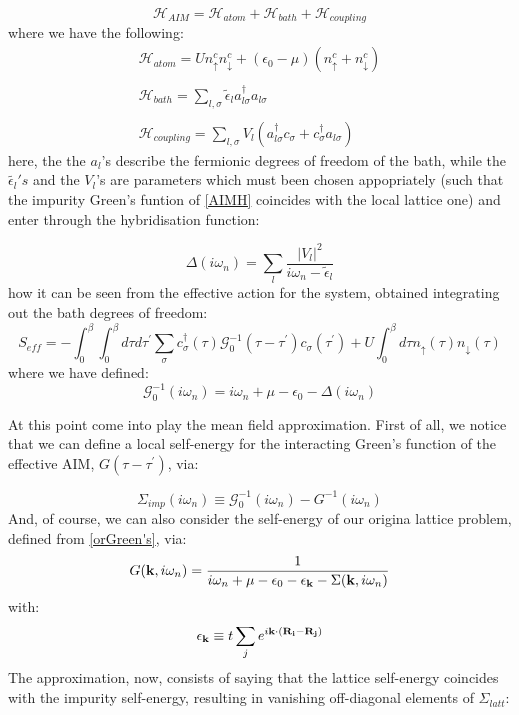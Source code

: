 \begin{equation}
\mathcal{H}_{AIM} = \mathcal{H}_{atom} + \mathcal{H}_{bath} + \mathcal{H}_{coupling}
\end{equation}
where we have the following:
\begin{equation}\label{AIMH}
\begin{array}{c}
\mathcal{H}_{atom} = Un_\uparrow^cn_\downarrow^c + (\epsilon_0 - \mu)(n_\uparrow^c+n_\downarrow^c) \\ \\ \mathcal{H}_{bath} = \sum_{l,\sigma}\tilde{\epsilon}_la_{l\sigma}^\dagger a_{l\sigma} \\ \\ \mathcal{H}_{coupling} = \sum_{l,\sigma}V_l(a_{l\sigma}^\dagger c_{\sigma} + c_{\sigma}^\dagger a_{l\sigma})
\end{array}
\end{equation}
here, the the $a_l$'s describe the fermionic degrees of freedom of the bath, while the $\tilde{\epsilon_l}'s$ and the $V_l$'s are parameters which must been chosen appopriately (such that the impurity Green's funtion of \eqref{AIMH} coincides with the local lattice one) and enter through the hybridisation function:

\begin{equation}
\Delta(i\omega_n) = \sum_l\frac{|V_l|^2}{i\omega_n - \tilde{\epsilon}_l}
\end{equation}
how it can be seen from the effective action for the system, obtained integrating out the bath degrees of freedom:
\begin{equation}
S_{eff} = -\int_0^\beta\int_0^\beta d\tau d\tau^\prime\sum_\sigma c_\sigma^\dagger(\tau)\mathscr{G}_0^{-1}(\tau-\tau^\prime)c_\sigma(\tau^\prime) + U\int_0^\beta d\tau n_\uparrow(\tau)n_\downarrow(\tau)
\end{equation}
where we have defined:
\begin{equation}
\mathscr{G}_0^{-1}(i\omega_n) = i\omega_n + \mu - \epsilon_0 - \Delta(i\omega_n) 
\end{equation}

At this point come into play the mean field approximation. First of all, we notice that we can define a local self-energy for the interacting Green's function of the effective AIM, $G(\tau-\tau^\prime)$, via:

\begin{equation}\label{s_imp}
\Sigma_{imp}(i\omega_n) \equiv \mathscr{G}_0^{-1}(i\omega_n) - G^{-1}(i\omega_n)
\end{equation}
And, of course, we can also consider the self-energy of our origina lattice problem, defined from \eqref{orGreen's}, via:
\begin{equation}\label{not_summed_over}
G(\bold{k},i\omega_n) = \frac{1}{i\omega_n + \mu - \epsilon_0 - \epsilon_{\bold{k}} -\Sigma(\bold{k},i\omega_n)}
\end{equation}
with:
\begin{equation}
\epsilon_\bold{k} \equiv t\sum_je^{i\bold{k}\cdot(\bold{R_i}-\bold{R_j})}
\end{equation}
The approximation, now, consists of saying that the lattice self-energy coincides with the impurity self-energy, resulting in vanishing off-diagonal elements of $\Sigma_{latt}$:

